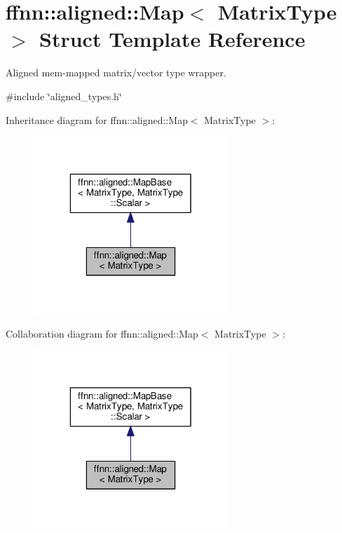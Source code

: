 \hypertarget{structffnn_1_1aligned_1_1_map}{\section{ffnn\-:\-:aligned\-:\-:Map$<$ Matrix\-Type $>$ Struct Template Reference}
\label{structffnn_1_1aligned_1_1_map}
}


Aligned mem-\/mapped matrix/vector type wrapper.  




{\ttfamily \#include \char`\"{}aligned\-\_\-types.\-h\char`\"{}}



Inheritance diagram for ffnn\-:\-:aligned\-:\-:Map$<$ Matrix\-Type $>$\-:
\nopagebreak
\begin{figure}[H]
\begin{center}
\leavevmode
\includegraphics[width=208pt]{structffnn_1_1aligned_1_1_map__inherit__graph}
\end{center}
\end{figure}


Collaboration diagram for ffnn\-:\-:aligned\-:\-:Map$<$ Matrix\-Type $>$\-:
\nopagebreak
\begin{figure}[H]
\begin{center}
\leavevmode
\includegraphics[width=208pt]{structffnn_1_1aligned_1_1_map__coll__graph}
\end{center}
\end{figure}
